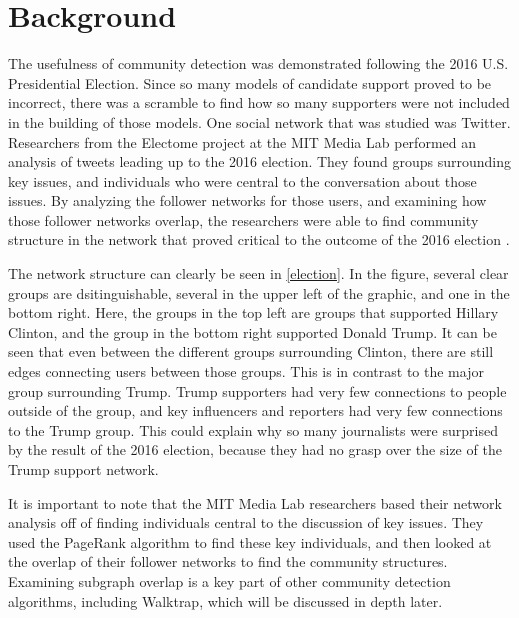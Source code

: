 \documentclass{article}
\begin{document}
\section{Background}
The usefulness of community detection was demonstrated following the 2016 U.S. Presidential Election. Since so many models of candidate support proved to be incorrect, there was a scramble to find how so many supporters were not included in the building of those models. One social network that was studied was Twitter. Researchers from the Electome project at the MIT Media Lab performed an analysis of tweets leading up to the 2016 election. They found groups surrounding key issues, and individuals who were central to the conversation about those issues. By analyzing the follower networks for those users, and examining how those follower networks overlap, the researchers were able to find community structure in the network that proved critical to the outcome of the 2016 election \cite{vice}.
\par
The network structure can clearly be seen in \ref{election}. In the figure, several clear groups are dsitinguishable, several in the upper left of the graphic, and one in the bottom right. Here, the groups in the top left are groups that supported Hillary Clinton, and the group in the bottom right supported Donald Trump. It can be seen that even between the different groups surrounding Clinton, there are still edges connecting users between those groups. This is in contrast to the major group surrounding Trump. Trump supporters had very few connections to people outside of the group, and key influencers and reporters had very few connections to the Trump group. This could explain why so many journalists were surprised by the result of the 2016 election, because they had no grasp over the size of the Trump support network.
\par
It is important to note that the MIT Media Lab researchers based their network analysis off of finding individuals central to the discussion of key issues. They used the PageRank algorithm to find these key individuals, and then looked at the overlap of their follower networks to find the community structures. Examining subgraph overlap is a key part of other community detection algorithms, including Walktrap, which will be discussed in depth later.
\end{document}
